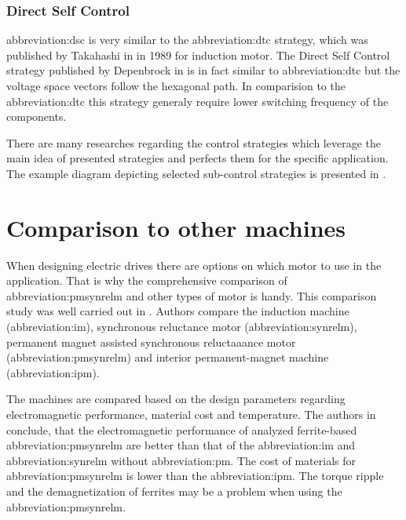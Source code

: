 \documentclass[a4paper, twoside, 11pt]{article}
\begin{document}
        \subsubsection{Direct Self Control}
            \gls{abbreviation:dsc} is very similar to the \gls{abbreviation:dtc} strategy, which was published by Takahashi in \cite{takahashi-high-performance-direct-torque-control-of-an-iduction-motor} in 1989 for induction motor. The Direct Self Control strategy published by Depenbrock in \cite{depenbrock-direct-self-control-of-inverter-fed-induction-machine} is in fact similar to \gls{abbreviation:dtc} but the voltage space vectors follow the hexagonal path. In comparision to the \gls{abbreviation:dtc} this strategy generaly require lower switching frequency of the components.

        \par
        There are many researches regarding the control strategies which leverage the main idea of presented strategies and perfects them for the specific application. The example diagram depicting selected sub-control strategies is presented in \cite{heidari-a-review-of-synchronour-relucatence-motor-drive-advancements}.
\section{Comparison to other machines}
    When designing electric drives there are options on which motor to use in the application. That is why the comprehensive comparison of \gls{abbreviation:pmsynrelm} and other types of motor is handy. This comparison study was well carried out in \cite{zhang-Comprehensive-Comparative-Study-on-Permanent-Magnet-Assisted-Synchronous-Reluctance-Motors-and-Other-Types-of-Motor}. Authors compare the induction machine (\gls{abbreviation:im}), synchronous reluctance motor (\gls{abbreviation:synrelm}), permanent magnet assisted synchronous reluctaaance motor (\gls{abbreviation:pmsynrelm}) and interior permanent-magnet machine (\gls{abbreviation:ipm}).\par
    The machines are compared based on the design parameters regarding electromagnetic performance, material cost and temperature. The authors in \cite{zhang-Comprehensive-Comparative-Study-on-Permanent-Magnet-Assisted-Synchronous-Reluctance-Motors-and-Other-Types-of-Motor} conclude, that the electromagnetic performance of analyzed ferrite-based \gls{abbreviation:pmsynrelm} are better than that of the \gls{abbreviation:im} and \gls{abbreviation:synrelm} without \gls{abbreviation:pm}. The cost of materials for \gls{abbreviation:pmsynrelm} is lower than the \gls{abbreviation:ipm}. The torque ripple and the demagnetization of ferrites may be a problem when using the \gls{abbreviation:pmsynrelm}. \cite{zhang-Comprehensive-Comparative-Study-on-Permanent-Magnet-Assisted-Synchronous-Reluctance-Motors-and-Other-Types-of-Motor}
\end{document}
